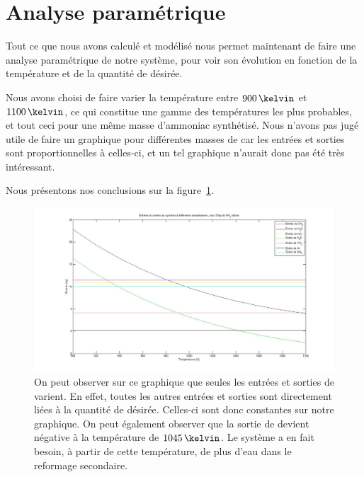 \documentclass[a4paper,12pt]{article}
\begin{document}
\section{Analyse paramétrique}

Tout ce que nous avons calculé et modélisé nous permet maintenant de faire une analyse paramétrique de notre système, pour voir son évolution en fonction de la température et de la quantité de  désirée.

Nous avons choisi de faire varier la température entre $900\,\kelvin$ et $1100\,\kelvin$, ce qui constitue une gamme des températures les plus probables, et tout ceci pour une même masse d'ammoniac synthétisé.
Nous n'avons pas jugé utile de faire un graphique pour différentes masses de  car les entrées et sorties sont proportionnelles à celles-ci, et un tel graphique n'aurait donc pas été très intéressant.

Nous présentons nos conclusions sur la figure~\ref{fig:graphe}.

\begin{figure}
    \begin{center}
        \includegraphics[width=\textwidth]{graphe1}
        \caption{On peut observer sur ce graphique que seules les entrées et sorties de
             varient.
            En effet, toutes les autres entrées et sorties sont directement
            liées à la quantité de  désirée.
            Celles-ci sont donc constantes sur notre graphique.
            On peut également observer que la sortie de  devient négative
            à la température de $1045\,\kelvin$.
            Le système a en fait besoin, à partir de cette température,
            de plus d'eau dans le reformage secondaire.
        }
        \label{fig:graphe}
    \end{center}
\end{figure}
\end{document}
